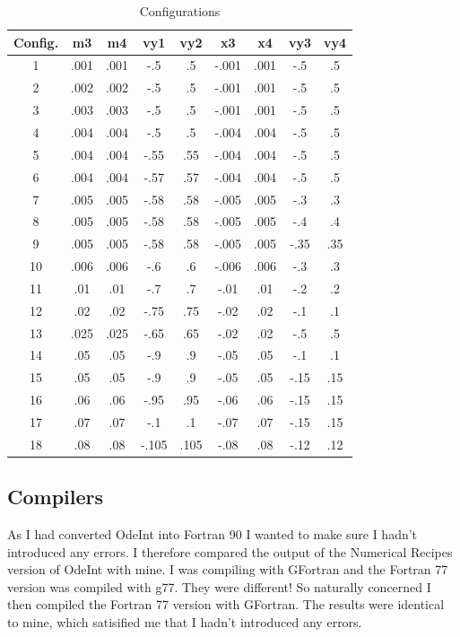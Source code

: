 \documentclass[a4paper,12pt]{article}
\begin{document}
\begin{table}[ht!]
  \centering
  \caption{Configurations}
  \label{tab:variables}
  \begin{tabular}{ccccccccc}
   Config. & m3 & m4 & vy1 & vy2 & x3 & x4 & vy3 & vy4\\
    \hline
   1 & .001 & .001 & -.5 & .5 & -.001 & .001 & -.5 & .5\\
   2 & .002 & .002 & -.5 & .5 & -.001 & .001 & -.5 & .5\\
   3 & .003 & .003 & -.5 & .5 & -.001 & .001 & -.5 & .5\\
   4 & .004 & .004 & -.5 & .5 & -.004 & .004 & -.5 & .5\\
   5 & .004 & .004 & -.55 & .55 & -.004 & .004 & -.5 & .5\\
   6 & .004 & .004 & -.57 & .57 & -.004 & .004 & -.5 & .5\\
   7 & .005 & .005 & -.58 & .58 & -.005 & .005 & -.3 & .3\\
   8 & .005 & .005 & -.58 & .58 & -.005 & .005 & -.4 & .4\\
   9 & .005 & .005 & -.58 & .58 & -.005 & .005 & -.35 & .35\\
   10 & .006 & .006 & -.6 & .6 & -.006 & .006 & -.3 & .3\\
   11 & .01 & .01 & -.7 & .7 & -.01 & .01 & -.2 & .2\\
   12 & .02 & .02 & -.75 & .75 & -.02 & .02 & -.1 & .1\\
   13 & .025 & .025 & -.65 & .65 & -.02 & .02 & -.5 & .5\\
   14 & .05 & .05 & -.9 & .9 & -.05 & .05 & -.1 & .1\\
   15 & .05 & .05 & -.9 & .9 & -.05 & .05 & -.15 & .15\\
   16 & .06 & .06 & -.95 & .95 & -.06 & .06 & -.15 & .15\\
   17 & .07 & .07 & -.1 & .1 & -.07 & .07 & -.15 & .15\\
   18 & .08 & .08 & -.105 & .105 & -.08 & .08 & -.12 & .12\\
  \end{tabular}
\end{table}
\subsection{Compilers}
As I had converted OdeInt into Fortran 90 I wanted to make sure I hadn't introduced any errors. I therefore compared the output of the Numerical Recipes
version of OdeInt with mine. I was compiling with GFortran and the Fortran 77 version was compiled with g77. They were different! So naturally concerned 
I then compiled the Fortran 77 version with GFortran. The results were identical to mine, which satisified me that I hadn't introduced any errors.
\end{document}
